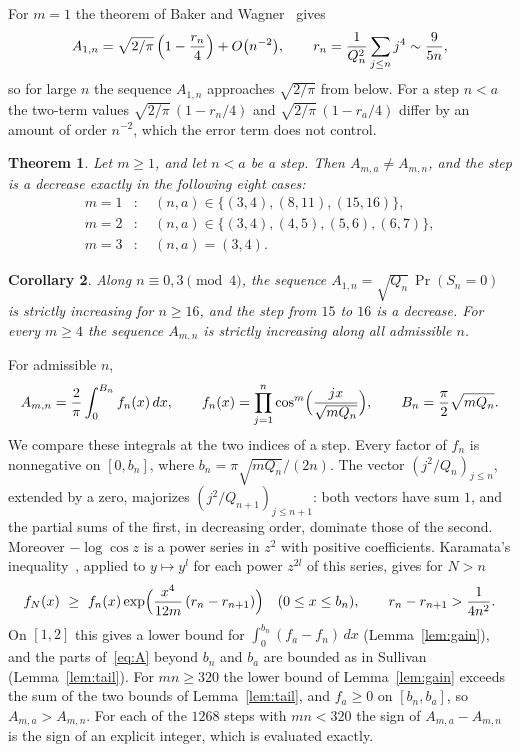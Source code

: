 \documentclass[11pt]{article}
\newtheorem{theorem}{Theorem}
\newtheorem{corollary}[theorem]{Corollary}
\theoremstyle{remark}
\begin{document}
For $m=1$ the theorem of Baker and Wagner~\cite[Theorem~1 and Section~2.2.1]{BW16} gives
\[
A_{1,n}=\sqrt{2/\pi}\,\Bigl(1-\frac{r_n}{4}\Bigr)+O\bigl(n^{-2}\bigr),\qquad
r_n=\frac{1}{Q_n^2}\sum_{j\le n}j^4\sim\frac{9}{5n},
\]
so for large $n$ the sequence $A_{1,n}$ approaches $\sqrt{2/\pi}$ from below. For a step $n<a$ the two-term values $\sqrt{2/\pi}\,(1-r_n/4)$ and $\sqrt{2/\pi}\,(1-r_a/4)$ differ by an amount of order $n^{-2}$, which the error term does not control.

\begin{theorem}\label{thm:main}
Let $m\ge1$, and let $n<a$ be a step. Then $A_{m,a}\ne A_{m,n}$, and the step is a decrease exactly in the following eight cases:
\begin{align*}
m=1&:\quad (n,a)\in\{(3,4),(8,11),(15,16)\},\\
m=2&:\quad (n,a)\in\{(3,4),(4,5),(5,6),(6,7)\},\\
m=3&:\quad (n,a)=(3,4).
\end{align*}
\end{theorem}

\begin{corollary}\label{cor:one}
Along $n\equiv0,3\pmod 4$, the sequence $A_{1,n}=\sqrt{Q_n}\,\Pr(S_n=0)$ is strictly increasing for $n\ge16$, and the step from $15$ to $16$ is a decrease. For every $m\ge4$ the sequence $A_{m,n}$ is strictly increasing along all admissible $n$.
\end{corollary}

For admissible $n$,
\begin{equation}\label{eq:A}
A_{m,n}=\frac2\pi\int_0^{B_n}f_n(x)\,dx,\qquad
f_n(x)=\prod_{j=1}^n\cos^m\Bigl(\frac{jx}{\sqrt{mQ_n}}\Bigr),\qquad B_n=\frac\pi2\sqrt{mQ_n}.
\end{equation}
We compare these integrals at the two indices of a step. Every factor of $f_n$ is nonnegative on $[0,b_n]$, where $b_n=\pi\sqrt{mQ_n}/(2n)$. The vector $(j^2/Q_n)_{j\le n}$, extended by a zero, majorizes $(j^2/Q_{n+1})_{j\le n+1}$: both vectors have sum $1$, and the partial sums of the first, in decreasing order, dominate those of the second. Moreover $-\log\cos z$ is a power series in $z^2$ with positive coefficients. Karamata's inequality~\cite[Chapter~3, Proposition~C.1]{MOA11}, applied to $y\mapsto y^l$ for each power $z^{2l}$ of this series, gives for $N>n$
\[
f_N(x)\ \ge\ f_n(x)\exp\Bigl(\frac{x^4}{12m}\,(r_n-r_{n+1})\Bigr)\quad(0\le x\le b_n),\qquad r_n-r_{n+1}>\frac{1}{4n^2}.
\]
On $[1,2]$ this gives a lower bound for $\int_0^{b_n}(f_a-f_n)\,dx$ (Lemma~\ref{lem:gain}), and the parts of~\eqref{eq:A} beyond $b_n$ and $b_a$ are bounded as in Sullivan~\cite[Lemma~2, Case~3]{Sul13} (Lemma~\ref{lem:tail}). For $mn\ge320$ the lower bound of Lemma~\ref{lem:gain} exceeds the sum of the two bounds of Lemma~\ref{lem:tail}, and $f_a\ge0$ on $[b_n,b_a]$, so $A_{m,a}>A_{m,n}$. For each of the $1268$ steps with $mn<320$ the sign of $A_{m,a}-A_{m,n}$ is the sign of an explicit integer, which is evaluated exactly.
\end{document}
